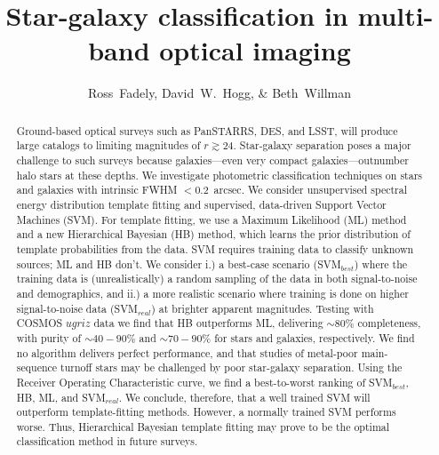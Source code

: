 \documentclass[12pt,preprint]{aastex}
\begin{document}
\title{Star-galaxy classification in multi-band optical imaging}
\author{Ross~Fadely,
        David~W.~Hogg,
        \& Beth~Willman}


%
%
\begin{abstract}
  Ground-based optical surveys such as PanSTARRS, DES, and LSST, will
  produce large catalogs to limiting magnitudes of $r \gtrsim 24$.
  Star-galaxy separation poses a major challenge to such surveys
  because galaxies---even very compact galaxies---outnumber halo stars
  at these depths.  We investigate photometric classification
  techniques on stars and galaxies with intrinsic FWHM $<0.2$~arcsec.
  We consider unsupervised spectral energy distribution template
  fitting and supervised, data-driven Support Vector Machines (SVM).
  For template fitting, we use a Maximum Likelihood (ML) method and a
  new Hierarchical Bayesian (HB) method, which learns the prior
  distribution of template probabilities from the data.  SVM requires training 
  data to classify unknown sources; ML and HB don't.  We consider i.) a
  best-case scenario (SVM$_{best}$) where the training data is
  (unrealistically) a random sampling of the data in both
  signal-to-noise and demographics, and ii.) a more realistic scenario
  where training is done on higher signal-to-noise data
  (SVM$_{real}$) at brighter apparent magnitudes.  Testing with COSMOS
  $ugriz$ data we find that HB outperforms ML, delivering $\sim80\%$
  completeness, with purity of $\sim40-90\%$ and $\sim70-90\%$ for stars and galaxies,
  respectively.  We find no algorithm delivers perfect performance, and 
  that studies of metal-poor main-sequence turnoff stars
  may be challenged by poor star-galaxy separation.  Using the Receiver Operating 
  Characteristic curve, we find a best-to-worst ranking of SVM$_{best}$, HB, ML, and 
  SVM$_{real}$.  We conclude, therefore, that a well trained SVM will outperform 
  template-fitting methods.  However, a normally trained SVM performs worse.  Thus, 
  Hierarchical Bayesian template fitting may prove to be the optimal classification method 
  in future surveys.  
\end{abstract}
\end{document}
